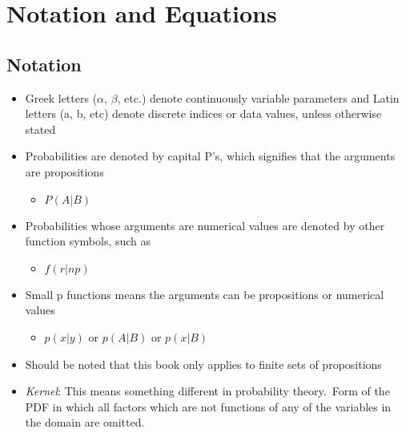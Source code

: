 \documentclass[../jaynes_prob_theory_notes.tex]{subfiles}
\begin{document}
\section{Notation and Equations}

\subsection{Notation}
    \begin{itemize}
        \item Greek letters ($\alpha$, $\beta$, etc.) denote continuously variable parameters and Latin letters (a, b, etc) denote discrete indices or data values, unless otherwise stated
        \item Probabilities are denoted by capital P's, which signifies that the arguments are propositions
            \begin{itemize}
                \item[] $P(A|B)$
            \end{itemize}
    
        \item Probabilities whose arguments are numerical values are denoted by other function symbols, such as
            \begin{itemize}
                \item[] $f(r|np)$
            \end{itemize}
    
        \item Small p functions means the arguments can be propositions or numerical values
            \begin{itemize}
                \item[] $p(x|y)$ or $p(A|B)$ or $p(x|B)$
            \end{itemize}
    
        \item Should be noted that this book only applies to finite sets of propositions
        \item \textit{Kernel}: This means something different in probability theory.\ Form of the PDF in which all factors which are not functions of any of the variables in the domain are omitted.
    \end{itemize}
\end{document}
